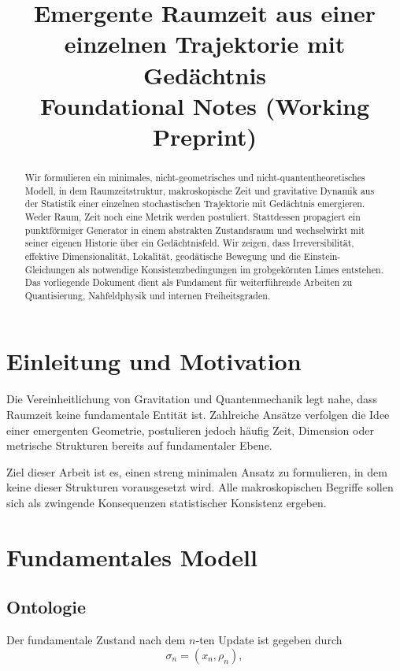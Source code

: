 \documentclass[11pt,a4paper]{article}
\title{Emergente Raumzeit aus einer einzelnen Trajektorie mit Gedächtnis \\ \large{Foundational Notes (Working Preprint)}}
\author{ }
\date{ }
\begin{document}
\maketitle

\begin{abstract}
Wir formulieren ein minimales, nicht-geometrisches und nicht-quantentheoretisches Modell, in dem Raumzeitstruktur, makroskopische Zeit und gravitative Dynamik aus der Statistik einer einzelnen stochastischen Trajektorie mit Gedächtnis emergieren. Weder Raum, Zeit noch eine Metrik werden postuliert. Stattdessen propagiert ein punktförmiger Generator in einem abstrakten Zustandsraum und wechselwirkt mit seiner eigenen Historie über ein Gedächtnisfeld. Wir zeigen, dass Irreversibilit\"at, effektive Dimensionalit\"at, Lokalität, geodätische Bewegung und die Einstein-Gleichungen als notwendige Konsistenzbedingungen im grobgek\"ornten Limes entstehen. Das vorliegende Dokument dient als Fundament für weiterführende Arbeiten zu Quantisierung, Nahfeldphysik und internen Freiheitsgraden.
\end{abstract}

\section{Einleitung und Motivation}

Die Vereinheitlichung von Gravitation und Quantenmechanik legt nahe, dass Raumzeit keine fundamentale Entität ist. Zahlreiche Ansätze verfolgen die Idee einer emergenten Geometrie, postulieren jedoch häufig Zeit, Dimension oder metrische Strukturen bereits auf fundamentaler Ebene.

Ziel dieser Arbeit ist es, einen streng minimalen Ansatz zu formulieren, in dem keine dieser Strukturen vorausgesetzt wird. Alle makroskopischen Begriffe sollen sich als zwingende Konsequenzen statistischer Konsistenz ergeben.

\section{Fundamentales Modell}

\subsection{Ontologie}

Der fundamentale Zustand nach dem $n$-ten Update ist gegeben durch
\begin{equation}
\sigma_n = (x_n, \rho_n),
\end{equation}
\end{document}
